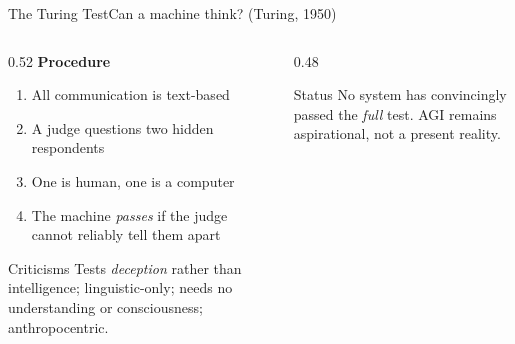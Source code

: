 \documentclass[aspectratio=169,11pt]{beamer}
\begin{document}
\begin{frame}{The Turing Test}{Can a machine think? (Turing, 1950)}
  \begin{columns}[T]
    \begin{column}{0.52\textwidth}
      \textbf{Procedure}
      \begin{enumerate}
        \item All communication is text-based
        \item A judge questions two hidden respondents
        \item One is human, one is a computer
        \item The machine \emph{passes} if the judge cannot reliably tell them apart
      \end{enumerate}
      \vspace{0.4em}
      \begin{alertblock}{Criticisms}
        \small Tests \emph{deception} rather than intelligence; linguistic-only;
        needs no understanding or consciousness; anthropocentric.
      \end{alertblock}
    \end{column}
    \begin{column}{0.48\textwidth}
      \begin{center}
      \end{center}
      \vspace{0.2em}
      \begin{block}{Status}
        \small No system has convincingly passed the \emph{full} test. AGI remains
        aspirational, not a present reality.
      \end{block}
    \end{column}
  \end{columns}
\end{frame}
\end{document}
